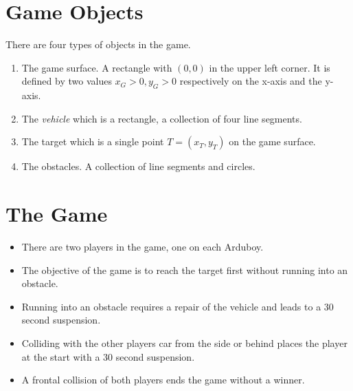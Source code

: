 \documentclass[11pt]{article}
\begin{document}
\section{Game Objects}
\label{sec-game-objects}
There are four types of objects in the game. 
\begin{enumerate}
    \item The game surface. A rectangle with $(0,0)$ in the upper left corner. 
        It is defined by two values $x_G > 0, y_G>0$ respectively on the x-axis
        and the y-axis.
    \item The {\sl vehicle} which is a rectangle, a collection of four line
        segments.
    \item The target which is a single point $T = (x_T, y_T)$ on the game
        surface.
    \item The obstacles. A collection of line segments and circles.
\end{enumerate}

\section{The Game}
\label{sec-the-game}
\begin{itemize}
    \item There are two players in the game, one on each Arduboy. 
    \item The objective of the game is to reach the target first without 
        running into an obstacle. 
    \item Running into an obstacle requires a repair of the vehicle and leads 
        to a 30 second suspension. 
    \item Colliding with the other players car from the side or behind places
        the player at the start with a 30 second suspension.
    \item A frontal collision of both players ends the game without a winner.
\end{itemize}
\end{document}
